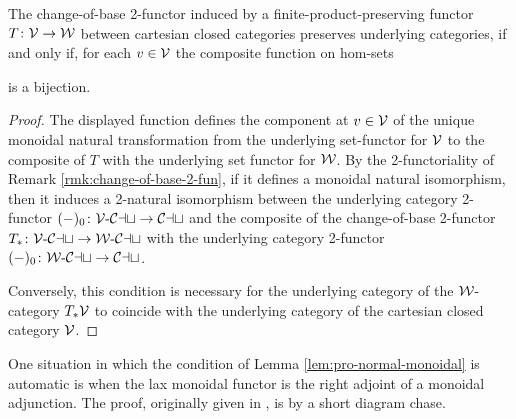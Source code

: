 \begin{lemma}\label{lem:pro-normal-monoidal} The change-of-base 2-functor induced by a finite-product-preserving functor $T \colon {\mathord{\mathcal{V}}} \to {\mathord{\mathcal{W}}}$ between cartesian closed categories preserves underlying categories, if and only if, for each $v \in {\mathord{\mathcal{V}}}$ the composite function on hom-sets
\begin{center}
\end{center} is a bijection.
\end{lemma}
\begin{proof}
The displayed function defines the component at $v \in {\mathord{\mathcal{V}}}$ of the unique monoidal natural transformation from the underlying set-functor for ${\mathord{\mathcal{V}}}$ to the composite of $T$ with the underlying set functor for ${\mathord{\mathcal{W}}}$. By the 2-functoriality of Remark \ref{rmk:change-of-base-2-fun}, if it defines a monoidal natural isomorphism, then it induces a 2-natural isomorphism between the underlying category 2-functor $(-)_0 \colon {{\mathord{\mathcal{V}}}}\text{-}{\mathord{\mathcal{Cat}}} \to {\mathord{\mathcal{Cat}}}$ and the composite of the change-of-base 2-functor $T_* \colon {{\mathord{\mathcal{V}}}}\text{-}{\mathord{\mathcal{Cat}}} \to{{\mathord{\mathcal{W}}}}\text{-}{\mathord{\mathcal{Cat}}}$ with the underlying category 2-functor $(-)_0 \colon {{\mathord{\mathcal{W}}}}\text{-}{\mathord{\mathcal{Cat}}} \to {\mathord{\mathcal{Cat}}}$.

Conversely, this condition is necessary for the underlying category of the ${\mathord{\mathcal{W}}}$-category $T_*{\mathord{\mathcal{V}}}$ to coincide with the underlying category of the cartesian closed category ${\mathord{\mathcal{V}}}$.
\end{proof}

One situation in which the condition of Lemma \ref{lem:pro-normal-monoidal} is automatic is when the lax monoidal functor is the right adjoint of a monoidal adjunction. The proof, originally given in \cite{Kelly:1974da}, is by a short diagram chase.


